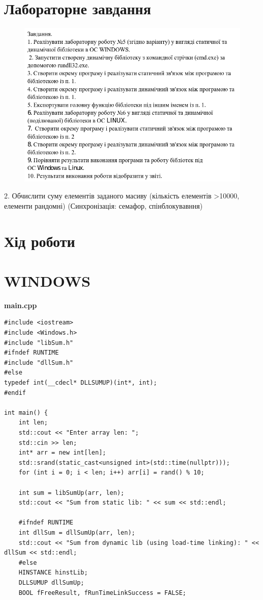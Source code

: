 \documentclass{article}
\begin{document}
\begin{normalsize}
	\section*{Лабораторне завдання}
	
	\begin{figure}[H]
		\centering
		\includegraphics[scale=0.7]{v}
	\end{figure}
	\begin{center}
		2. Обчислити суму елементів заданого масиву (кількість елементів >10000,
		елементи рандомні) (Синхронізація: семафор, спінблокувавння)
	\end{center}

	\section*{Хід роботи}	
	\section*{WINDOWS}
	\textbf{main.cpp}
	\begin{lstlisting}
#include <iostream>
#include <Windows.h>
#include "libSum.h"
#ifndef RUNTIME
#include "dllSum.h"
#else
typedef int(__cdecl* DLLSUMUP)(int*, int);
#endif

int main() {
	int len;
	std::cout << "Enter array len: ";
	std::cin >> len;
	int* arr = new int[len];
	std::srand(static_cast<unsigned int>(std::time(nullptr)));
	for (int i = 0; i < len; i++) arr[i] = rand() % 10;
	
	int sum = libSumUp(arr, len);
	std::cout << "Sum from static lib: " << sum << std::endl;
	
	#ifndef RUNTIME
	int dllSum = dllSumUp(arr, len);
	std::cout << "Sum from dynamic lib (using load-time linking): " << dllSum << std::endl;
	#else
	HINSTANCE hinstLib;
	DLLSUMUP dllSumUp;
	BOOL fFreeResult, fRunTimeLinkSuccess = FALSE;
	

\end{lstlisting}
\end{normalsize}
\end{document}
